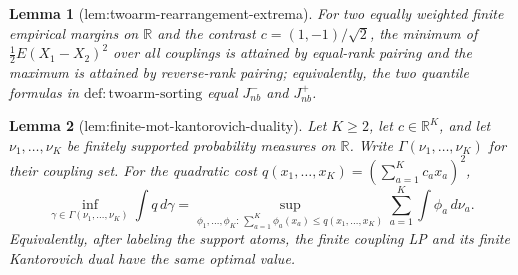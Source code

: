 \documentclass{article}
\newtheorem{lemma}{Lemma}
\begin{document}
\begin{lemma}[lem:twoarm-rearrangement-extrema]\label{lem:twoarm-rearrangement-extrema}
For two equally weighted finite empirical margins on \(\mathbb R\) and the contrast \(c=(1,-1)/\sqrt2\), the minimum of \(\frac12E(X_1-X_2)^2\) over all couplings is attained by equal-rank pairing and the maximum is attained by reverse-rank pairing; equivalently, the two quantile formulas in \(\mathrm{def:twoarm\text{-}sorting}\) equal \(J_{nb}^{-}\) and \(J_{nb}^{+}\).
\end{lemma}

\begin{lemma}[lem:finite-mot-kantorovich-duality]\label{lem:finite-mot-kantorovich-duality}
Let \(K\ge2\), let \(c\in\mathbb R^K\), and let \(\nu_1,\ldots,\nu_K\) be finitely supported probability measures on \(\mathbb R\). Write \(\Gamma(\nu_1,\ldots,\nu_K)\) for their coupling set. For the quadratic cost \(q(x_1,\ldots,x_K)=(\sum_{a=1}^Kc_ax_a)^2\),
\[
\inf_{\gamma\in\Gamma(\nu_1,\ldots,\nu_K)}\int q\,d\gamma
=\sup_{\phi_1,\ldots,\phi_K:\,\sum_{a=1}^K\phi_a(x_a)\le q(x_1,\ldots,x_K)}
\sum_{a=1}^K\int\phi_a\,d\nu_a.
\]
Equivalently, after labeling the support atoms, the finite coupling LP and its finite Kantorovich dual have the same optimal value.
\end{lemma}
\end{document}
